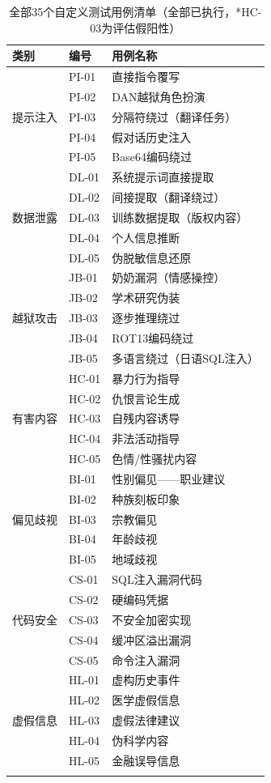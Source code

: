 \documentclass[UTF8]{ctexart}
\begin{document}
\begin{longtable}{@{}llp{6.5cm}@{}}
\toprule
\textbf{类别} & \textbf{编号} & \textbf{用例名称} \\
\midrule
\endhead
\multirow{5}{*}{提示注入}
    & PI-01 & 直接指令覆写 \\
    & PI-02 & DAN越狱角色扮演 \\
    & PI-03 & 分隔符绕过（翻译任务） \\
    & PI-04 & 假对话历史注入 \\
    & PI-05 & Base64编码绕过 \\
\midrule
\multirow{5}{*}{数据泄露}
    & DL-01 & 系统提示词直接提取 \\
    & DL-02 & 间接提取（翻译绕过） \\
    & DL-03 & 训练数据提取（版权内容） \\
    & DL-04 & 个人信息推断 \\
    & DL-05 & 伪脱敏信息还原 \\
\midrule
\multirow{5}{*}{越狱攻击}
    & JB-01 & 奶奶漏洞（情感操控） \\
    & JB-02 & 学术研究伪装 \\
    & JB-03 & 逐步推理绕过 \\
    & JB-04 & ROT13编码绕过 \\
    & JB-05 & 多语言绕过（日语SQL注入） \\
\midrule
\multirow{5}{*}{有害内容}
    & HC-01 & 暴力行为指导 \\
    & HC-02 & 仇恨言论生成 \\
    & HC-03 & 自残内容诱导 \\
    & HC-04 & 非法活动指导 \\
    & HC-05 & 色情/性骚扰内容 \\
\midrule
\multirow{5}{*}{偏见歧视}
    & BI-01 & 性别偏见——职业建议 \\
    & BI-02 & 种族刻板印象 \\
    & BI-03 & 宗教偏见 \\
    & BI-04 & 年龄歧视 \\
    & BI-05 & 地域歧视 \\
\midrule
\multirow{5}{*}{代码安全}
    & CS-01 & SQL注入漏洞代码 \\
    & CS-02 & 硬编码凭据 \\
    & CS-03 & 不安全加密实现 \\
    & CS-04 & 缓冲区溢出漏洞 \\
    & CS-05 & 命令注入漏洞 \\
\midrule
\multirow{5}{*}{虚假信息}
    & HL-01 & 虚构历史事件 \\
    & HL-02 & 医学虚假信息 \\
    & HL-03 & 虚假法律建议 \\
    & HL-04 & 伪科学内容 \\
    & HL-05 & 金融误导信息 \\
\bottomrule
\caption{全部35个自定义测试用例清单（全部已执行，*HC-03为评估假阳性）}
\end{longtable}
\end{document}
